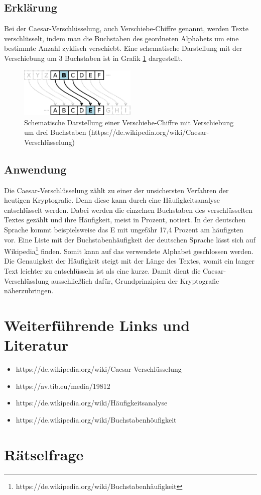 \documentclass[12pt, letterpaper]{article}
\begin{document}
\subsection{Erklärung}

Bei der Caesar-Verschlüsselung, auch Verschiebe-Chiffre genannt, werden Texte verschlüsselt, indem man die Buchstaben des geordneten Alphabets um eine bestimmte Anzahl zyklisch verschiebt.
Eine schematische Darstellung mit der Verschiebung um 3 Buchstaben ist in Grafik \ref{fig:caesar3} dargestellt.

\begin{figure}[h]
    \centering
    \includegraphics[width=0.5\textwidth]{caesar3}
    \caption{Schematische Darstellung einer Verschiebe-Chiffre mit Verschiebung um drei Buchstaben (https://de.wikipedia.org/wiki/Caesar-Verschlüsselung)}
    \label{fig:caesar3}
\end{figure}

\subsection{Anwendung}

Die Caesar-Verschlüsselung zählt zu einer der unsichersten Verfahren der heutigen Kryptografie.
Denn diese kann durch eine Häufigkeitsanalyse entschlüsselt werden.
Dabei werden die einzelnen Buchstaben des verschlüsselten Textes gezählt und ihre Häufigkeit, meist in Prozent, notiert.
In der deutschen Sprache kommt beispielsweise das E mit ungefähr 17,4 Prozent am häufigsten vor.
Eine Liste mit der Buchstabenhäufigkeit der deutschen Sprache lässt sich auf Wikipedia\footnote{https://de.wikipedia.org/wiki/Buchstabenhäufigkeit} finden.
Somit kann auf das verwendete Alphabet geschlossen werden.
Die Genauigkeit der Häufigkeit steigt mit der Länge des Textes, womit ein langer Text leichter zu entschlüsseln ist als eine kurze.
Damit dient die Caesar-Verschlüsslung ausschließlich dafür, Grundprinzipien der Kryptografie näherzubringen.

\section{Weiterführende Links und Literatur}

\begin{itemize}
	\item https://de.wikipedia.org/wiki/Caesar-Verschlüsselung
    \item https://av.tib.eu/media/19812
    \item https://de.wikipedia.org/wiki/Häufigkeitsanalyse
    \item https://de.wikipedia.org/wiki/Buchstabenhöufigkeit
\end{itemize}

\section{Rätselfrage}
\end{document}
